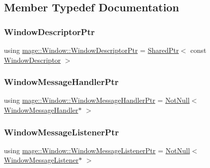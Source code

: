\subsection{Member Typedef Documentation}
\mbox{\label{classmage_1_1_window_ac41b052d8e8dd0571b3ec862e8f6da05}} 
\subsubsection{\texorpdfstring{Window\+Descriptor\+Ptr}{WindowDescriptorPtr}}
{\footnotesize\ttfamily using \mbox{\hyperlink{classmage_1_1_window_ac41b052d8e8dd0571b3ec862e8f6da05}{mage\+::\+Window\+::\+Window\+Descriptor\+Ptr}} =  \mbox{\hyperlink{namespacemage_a1e01ae66713838a7a67d30e44c67703e}{Shared\+Ptr}}$<$ const \mbox{\hyperlink{classmage_1_1_window_descriptor}{Window\+Descriptor}} $>$}

\mbox{\label{classmage_1_1_window_add1d792fb9f71e70d4fb07409d80cfdd}} 
\subsubsection{\texorpdfstring{Window\+Message\+Handler\+Ptr}{WindowMessageHandlerPtr}}
{\footnotesize\ttfamily using \mbox{\hyperlink{classmage_1_1_window_add1d792fb9f71e70d4fb07409d80cfdd}{mage\+::\+Window\+::\+Window\+Message\+Handler\+Ptr}} =  \mbox{\hyperlink{namespacemage_a8769f9d670d6b585ea306cb1062af94b}{Not\+Null}}$<$ \mbox{\hyperlink{classmage_1_1_window_message_handler}{Window\+Message\+Handler}}$\ast$ $>$}

\mbox{\label{classmage_1_1_window_a0e0a4f2a3f6db176f6aec454b94a06fb}} 
\subsubsection{\texorpdfstring{Window\+Message\+Listener\+Ptr}{WindowMessageListenerPtr}}
{\footnotesize\ttfamily using \mbox{\hyperlink{classmage_1_1_window_a0e0a4f2a3f6db176f6aec454b94a06fb}{mage\+::\+Window\+::\+Window\+Message\+Listener\+Ptr}} =  \mbox{\hyperlink{namespacemage_a8769f9d670d6b585ea306cb1062af94b}{Not\+Null}}$<$ \mbox{\hyperlink{classmage_1_1_window_message_listener}{Window\+Message\+Listener}}$\ast$ $>$}



